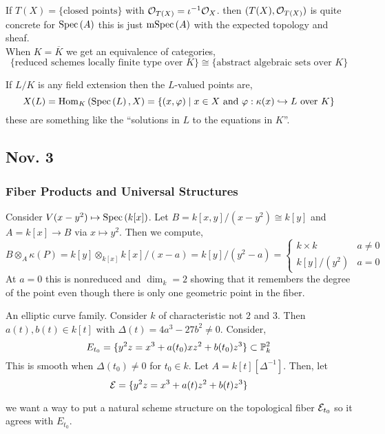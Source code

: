 \documentclass[12pt]{article}
\begin{document}
If $T(X) = \{ \text{closed points} \}$ with $\struct{T(X)} = \iota^{-1} \struct{X}$. then $(T(X), \struct{T(X)})$ is quite concrete for $\Spec{A}$ this is just $\mSpec{A}$ with the expected topology and sheaf. 
\bigskip\\
When $K = \overline{K}$ we get an equivalence of categories,
\[ \{ \text{reduced schemes locally finite type over } K \} \cong \{ \text{abstract algebraic sets over } K \} \]

\begin{defn}
If $L / K$ is any field extension then the $L$-valued points are,
\[ X(L) = \Hom{K}{\Spec{L}}{X} = \{ (x, \varphi) \mid x \in X \text{ and } \varphi : \kappa(x) \embed L \text{ over } K \} \]
these are something like the ``solutions in $L$ to the equations in $K$''.
\end{defn}

\subsection{Nov. 3}

\subsubsection{Fiber Products and Universal Structures}

\begin{example}
Consider $V(x - y^2) \mapsto \Spec{k[x]}$. Let $B = k[x,y]/(x-y^2) \cong k[y]$ and $A = k[x] \to B$ via $x \mapsto y^2$. Then we compute,
\[ B \otimes_A \kappa(P) = k[y] \otimes_{k[x]} k[x]/(x-a) = k[y]/(y^2 - a) = 
\begin{cases}
k \times k & a \neq 0
\\
k[y]/(y^2) & a = 0
\end{cases} \]
At $a = 0$ this is nonreduced and $\dim_k = 2$ showing that it remembers the degree of the point even though there is only one geometric point in the fiber.
\end{example}

\begin{example}
An elliptic curve family. Consider $k$ of characteristic not $2$ and $3$. Then $a(t), b(t) \in k[t]$ with $\Delta(t) = 4 a^3 - 27b^2 \neq 0$. Consider,
\[ E_{t_0} = \{ y^2z = x^3 + a(t_0) x z^2 + b(t_0) z^3 \} \subset \P^2_k \]
This is smooth when $\Delta(t_0) \neq 0$ for $t_0 \in k$. Let $A = k[t][\Delta^{-1}]$. Then, let
\[  \E = \{ y^2 z = x^3 + a(t) z^2 + b(t) z^3 \} \]
\begin{center}
\end{center}
we want a way to put a natural scheme structure on the topological fiber $\E_{t_0}$ so it agrees with $E_{t_0}$. 
\end{example}
\end{document}
